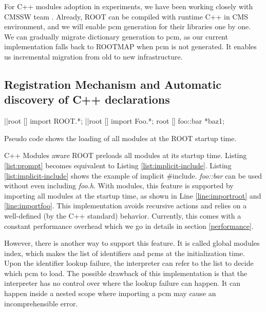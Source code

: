 \documentclass{webofc}
\begin{document}
For C++ modules adoption in experiments, we have been working closely with CMSSW team \cite{cms}. Already, ROOT can be compiled with runtime C++ in CMS environment, and we will enable pcm generation for their libraries one by one. We can gradually migrate dictionary generation to pcm, as our current implementation falls back to ROOTMAP when pcm is not generated. It enables us incremental migration from old to new infrastructure.

\subsection{Registration Mechanism and Automatic discovery of C++ declarations}
\label{subsec:preloading}

\begin{listing}[h]
    \noindent
    \begin{minipage}[h]{.7\textwidth}
    \begin{cppcode*}{}
    |\label{line:importroot}|root [] import ROOT.*;
    |\label{line:importfoo}|root [] import Foo.*;
    root [] foo::bar *baz1;
    \end{cppcode*}
    \end{minipage}
    \caption{Pseudo code shows the loading of all modules at the ROOT startup time.}
    \label{list:implicit-include}
\end{listing}

C++ Modules aware ROOT preloads all modules at its startup time. Listing \ref{list:prompt} becomes equivalent to Listing \ref{list:implicit-include}. Listing \ref{list:implicit-include} shows the example of implicit \#include. {\it foo::bar} can be used without even including {\it foo.h}. With modules, this feature is supported by importing all modules at the startup time, as shown in Line \ref{line:importroot} and \ref{line:importfoo}. This implementation avoids recursive actions and relies on a well-defined (by the C++ standard) behavior. Currently, this comes with a constant performance overhead which we go in details in section \ref{performance}.

However, there is another way to support this feature. It is called global modules index, which makes the list of identifiers and pcms at the initialization time. Upon the identifier lookup failure, the interpreter can refer to the list to decide which pcm to load. The possible drawback of this implementation is that the interpreter has no control over where the lookup failure can happen. It can happen inside a nested scope where importing a pcm may cause an incomprehensible error.
\end{document}
